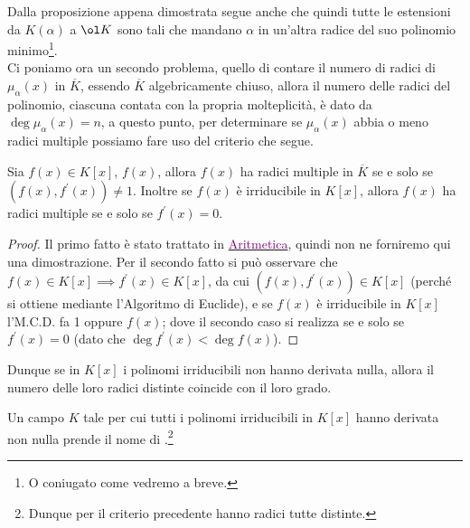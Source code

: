 \documentclass[11pt]{scrartcl}
\begin{document}
Dalla proposizione appena dimostrata segue anche che quindi tutte le estensioni da $K(\alpha)$ a $\ol K$ sono tali che mandano $\alpha$ in un'altra radice del suo polinomio minimo\footnote{O coniugato come vedremo a breve.}.\\
Ci poniamo ora un secondo problema, quello di contare il numero di radici di $\mu_\alpha (x)$ in $\overline K$, essendo $\overline K$ algebricamente chiuso, allora il numero delle radici del polinomio, ciascuna contata 
con la propria molteplicità, è dato da $\deg \mu_\alpha(x) = n$, a questo punto, per determinare se $\mu_\alpha(x)$ abbia o meno radici multiple possiamo fare uso del criterio che segue.

\begin{theorem}
	\label{derivata}
	Sia $f(x) \in K[x]$, $f(x)$, allora $f(x)$ ha radici multiple in $\overline K$ se e solo se $(f(x),f^{\prime}(x)) \ne 1$. Inoltre se $f(x)$ è irriducibile in $K[x]$, allora $f(x)$ ha radici multiple se e solo se $f^{\prime}(x) = 0$.
\end{theorem}

\begin{proof}
    Il primo fatto è stato trattato in \href{https://github.com/diego-unipi/Appunti-Aritmetica}{\textcolor{purple}{Aritmetica}}, quindi non ne forniremo qui una dimostrazione. Per il secondo fatto si può osservare che $f(x) \in K[x] \implies f^{\prime}(x) \in K[x]$,
    da cui $(f(x),f^{\prime}(x)) \in K[x]$ (perché si ottiene mediante l'Algoritmo di Euclide), e se $f(x)$ è irriducibile in $K[x]$ l'M.C.D. fa 1 oppure $f(x)$; dove il secondo caso si realizza se e solo se $f^{\prime}(x) = 0$ (dato che $\deg f^{\prime}(x) < \deg f(x)$).
\end{proof}

Dunque se in $K[x]$ i polinomi irriducibili non hanno derivata nulla, allora il numero delle loro radici distinte coincide con il loro grado.

\begin{definition}
    Un campo $K$ tale per cui tutti i polinomi irriducibili in $K[x]$ hanno derivata non nulla prende il nome di .\footnote{Dunque per il criterio precedente hanno radici tutte distinte.}
\end{definition}
\end{document}
